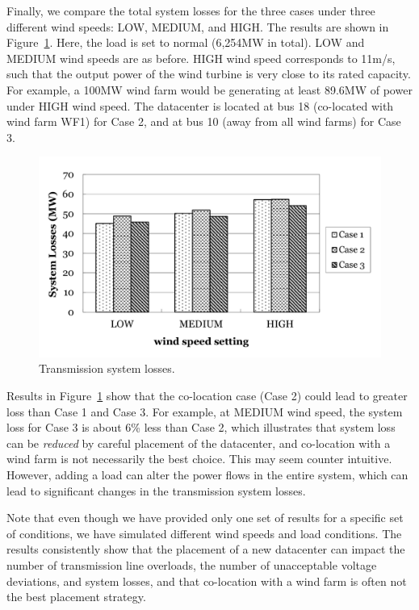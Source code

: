 Finally, we compare the total system losses for the three cases under
three different wind speeds: LOW, MEDIUM, and HIGH.  The results are
shown in Figure~\ref{fig:loss-cases}.  Here, the load is set to normal
(6,254MW in total).  LOW and MEDIUM wind speeds are as before.  HIGH
wind speed corresponds to 11m/s, such that the output power of the
wind turbine is very close to its rated capacity. For example, a 100MW
wind farm would be generating at least 89.6MW of power under HIGH wind
speed.  The datacenter is located at bus 18 (co-located with wind farm
WF1) for Case 2, and at bus 10 (away from all wind farms) for Case 3.

\begin{figure}[hb]
\centering
\includegraphics[width=1\columnwidth]{img/loss3cases.pdf}
\caption{Transmission system losses.}%
\label{fig:loss-cases}
\end{figure}

Results in Figure~\ref{fig:loss-cases} show that the co-location case
(Case 2) could lead to greater loss than Case 1 and Case 3. For
example, at MEDIUM wind speed, the system loss for Case 3 is about 6\%
less than Case 2, which illustrates that system loss can be {\em
  reduced} by careful placement of the datacenter, and co-location
with a wind farm is not necessarily the best choice.  This may seem
counter intuitive.  However, adding a load can alter the power flows
in the entire system, which can lead to significant changes in the
transmission system losses.

Note that even though we have provided only one set of results for a
specific set of conditions, we have simulated different wind speeds and
load conditions.  The results consistently show that the placement of
a new datacenter can impact the number of transmission line overloads,
the number of unacceptable voltage deviations, and system losses,
and that co-location with a wind farm is often not the best placement
strategy.


